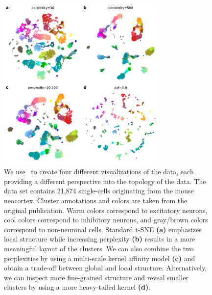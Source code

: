 \documentclass[article]{jss}
\newcommand{\opentsne}{\pkg{openTSNE}}
\begin{document}
\begin{figure}[htbp]
  \center
  \includegraphics[width=0.75\textwidth]{tasic2018}
  \caption{\label{fig:tasic}
  We use \opentsne\ to create four different
  visualizations of the \citet{tasic2018shared} data,
  each providing a different perspective into the topology of the data.
  The data set contains 21,874 single-cells originating from the mouse
  neocortex. Cluster annotations and colors are taken from the original
  publication. Warm colors correspond to excitatory neurons, cool colors
  correspond to inhibitory neurons, and gray/brown colors correspond to
  non-neuronal cells. Standard t-SNE \textbf{(a)} emphasizes local
  structure while increasing perplexity \textbf{(b)} results in a more
  meaningful layout of the clusters. We can also combine the two
  perplexities by using a multi-scale kernel affinity model \textbf{(c)}
  and obtain a trade-off between global and local structure.
  Alternatively, we can inspect more fine-grained structure and reveal
  smaller clusters by using a more heavy-tailed kernel \textbf{(d)}.}
\end{figure}
\end{document}
